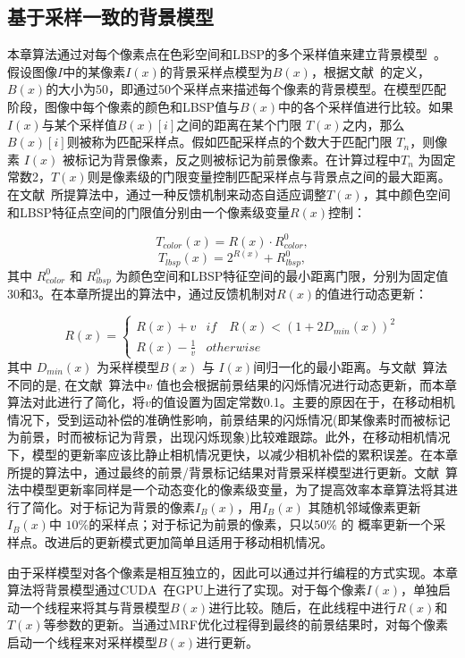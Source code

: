 \subsection{基于采样一致的背景模型}
\label {ch4:sec:sub:scam}

本章算法通过对每个像素点在色彩空间和LBSP的多个采样值来建立背景模型~\cite{subsenseTIP}。假设图像$I$中的某像素$I(x)$的背景采样点模型为$B(x)$，根据文献~的定义，$B(x)$的大小为50，即通过50个采样点来描述每个像素的背景模型。在模型匹配阶段，图像中每个像素的颜色和LBSP值与$B(x)$中的各个采样值进行比较。如果$I(x)$与某个采样值$B(x)[i]$之间的距离在某个门限 $T(x)$之内，那么$B(x)[i]$则被称为匹配采样点。假如匹配采样点的个数大于匹配门限 $ T_{n}$，则像素 $I(x)$ 被标记为背景像素，反之则被标记为前景像素。在计算过程中$T_{n}$ 为固定常数2，$T(x)$则是像素级的门限变量控制匹配采样点与背景点之间的最大距离。在文献~所提算法中，通过一种反馈机制来动态自适应调整$T(x)$，其中颜色空间和LBSP特征点空间的门限值分别由一个像素级变量$R(x)$控制：


$$T_{color}(x) = R(x) \cdot R^{0}_{color},$$
$$T_{lbsp}(x) = 2^{R(x)} + R^{0}_{lbsp},$$
其中 $R^{0}_{color}$ 和 $R^{0}_{lbsp}$ 为颜色空间和LBSP特征空间的最小距离门限，分别为固定值30和3\cite{subsenseTIP}。在本章所提出的算法中，通过反馈机制对$R(x)$的值进行动态更新：

$$ R(x) = \begin{cases}  R(x)+v & if \quad {R(x)<(1+2D_{min}(x))}^{2} \\  R(x) - \frac{1 }{v } & otherwise \end{cases}$$
其中 $D_{min}(x)$ 为采样模型$B(x)$ 与 $I(x)$间归一化的最小距离。与文献~算法不同的是, 在文献~算法中$v$ 值也会根据前景结果的闪烁情况进行动态更新，而本章算法对此进行了简化，将$v$的值设置为固定常数0.1。主要的原因在于，在移动相机情况下，受到运动补偿的准确性影响，前景结果的闪烁情况(即某像素时而被标记为前景，时而被标记为背景，出现闪烁现象)比较难跟踪。此外，在移动相机情况下，模型的更新率应该比静止相机情况更快，以减少相机补偿的累积误差。在本章所提的算法中，通过最终的前景/背景标记结果对背景采样模型进行更新。文献~算法中模型更新率同样是一个动态变化的像素级变量，为了提高效率本章算法将其进行了简化。对于标记为背景的像素$I_{B}(x)$，用$I_{B}(x)$ 其随机邻域像素更新$I_{B}(x)$中 $10\%$的采样点；对于标记为前景的像素，只以$50\% $ 的 概率更新一个采样点。改进后的更新模式更加简单且适用于移动相机情况。 \par
由于采样模型对各个像素是相互独立的，因此可以通过并行编程的方式实现。本章算法将背景模型通过CUDA~\cite{CUDA}在GPU上进行了实现。对于每个像素$I(x)$，单独启动一个线程来将其与背景模型$B(x)$进行比较。随后，在此线程中进行$R(x)$和 $T(x)$等参数的更新。当通过MRF优化过程得到最终的前景结果时，对每个像素启动一个线程来对采样模型$B(x)$进行更新。

